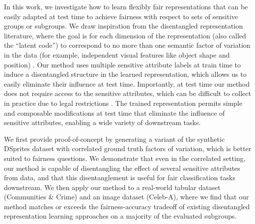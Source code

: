 In this work, we investigate how to learn flexibly fair representations that can be easily adapted at test time to achieve fairness with respect to sets of sensitive groups or subgroups.
We draw inspiration from the disentangled representation literature, where the goal is for each dimension of the representation (also called the ``latent code'') to correspond to no more than one semantic factor of variation in the data (for example, independent visual features like object shape and position) \citep{higgins2016beta, locatello2018challenging}.
Our method uses multiple sensitive attribute labels at train time to induce a disentangled structure in the learned representation, which allows us to easily eliminate their influence at test time.
Importantly, at test time our method does not require access to the sensitive attributes, which can be difficult to collect in practice due to legal restrictions \citep{elliot2008new,division1983}.
The trained representation permits simple and composable modifications at test time that eliminate the influence of sensitive attributes, enabling a wide variety of downstream tasks.

We first provide proof-of-concept by generating a variant of the synthetic DSprites dataset with correlated ground truth factors of variation, which is better suited to fairness questions.
We demonstrate that even in the correlated setting, our method is capable of disentangling the effect of several sensitive attributes from data, and that this disentanglement is useful for fair classification tasks downstream.
We then apply our method to a real-world tabular dataset (Communities \& Crime) and an image dataset (Celeb-A), where we find that our method matches or exceeds the fairness-accuracy tradeoff of existing disentangled representation learning approaches on a majority of the evaluated subgroups.
